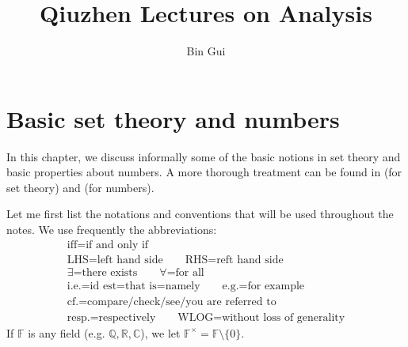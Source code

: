 \documentclass[12pt,b5paper,notitlepage]{article}
\title{Qiuzhen Lectures on Analysis}
\author{{\sc Bin Gui}
}
\theoremstyle{definition}
\theoremstyle{plain}
\newcommand{\Cbb}{\mathbb C}
\newcommand{\Qbb}{\mathbb Q}
\newcommand{\Rbb}{\mathbb R}
\newcommand{\Fbb}{\mathbb F}
\numberwithin{equation}{section}
\begin{document}
\sloppy %
	\setcounter{page}{1}
	






	
	\maketitle



\makeatletter
\newcommand*{\toccontents}{}
\makeatother
\toccontents



	


\newpage

\section{Basic set theory and numbers}


In this chapter, we discuss informally some of the basic notions in set theory and basic properties about numbers. A more thorough treatment can be found in \cite[Ch. 1]{Mun} (for set theory) and \cite[Ch. 1]{Rud-P} (for numbers). 

Let me first list the notations and conventions that will be used throughout the notes. We use frequently the abbreviations:
\begin{gather*}
\text{iff=if and only if}\\
\text{LHS=left hand side}\qquad
\text{RHS=reft hand side}\\
\text{$\exists$=there exists}\qquad \text{$\forall$=for all}\\
\text{i.e.=id est=that is=namely}\qquad\text{e.g.=for example}\\
\text{cf.=compare/check/see/you are referred to}\\
\text{resp.=respectively}\qquad 
\text{WLOG=without loss of generality}
\end{gather*}
If $\Fbb$ is any field (e.g. $\Qbb,\Rbb,\Cbb$), we let $\Fbb^\times=\Fbb\setminus\{0\}$. \index{F@$\Fbb^\times=\Fbb\setminus\{0\}$}
\end{document}
